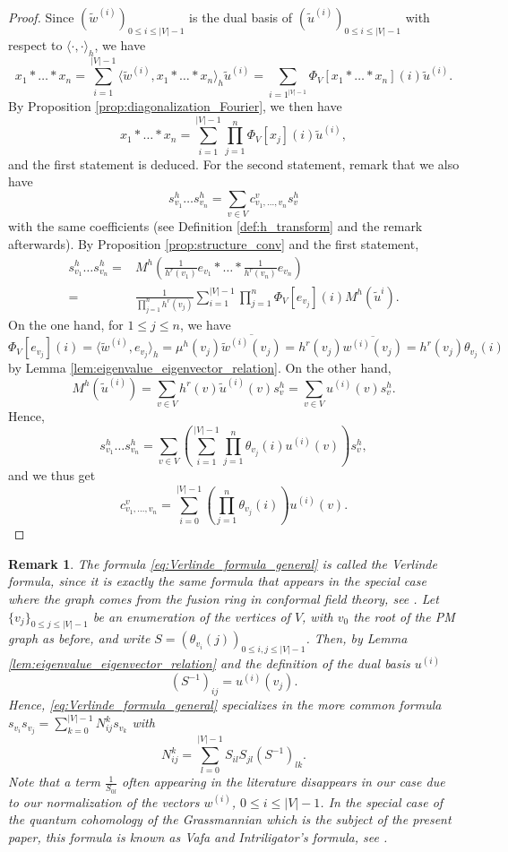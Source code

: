 \documentclass[10pt,11pt]{amsart}%
\newtheorem{remark}[theorem]{Remark}
\begin{document}
\begin{proof}
Since $(\tilde{w}^{(i)})_{0\leq i\leq |V|-1}$ is the dual basis of $(\tilde{u}^{(i)})_{0\leq i\leq |V|-1}$ with respect to $\langle \cdot,\cdot\rangle_h$, we have
$$x_1*\dots *x_n=\sum_{i=1}^{|V|-1}\langle \tilde{w}^{(i)},x_1*\dots *x_n\rangle_h \tilde{u}^{(i)}=\sum_{i=1^{|V|-1}}\Phi_V[x_1*\dots *x_n](i) \tilde{u}^{(i)}.$$
By Proposition \ref{prop:diagonalization_Fourier}, we then have 
$$x_1*\dots *x_n=\sum_{i=1}^{|V|-1}\prod_{j=1}^n\Phi_V[x_j](i)\tilde{u}^{(i)},$$
and the first statement is deduced. For the second statement, remark that we also have
$$s_{v_1}^h\dots s_{v_n}^h=\sum_{v\in V}c_{v_1,\ldots,v_n}^vs_v^h$$
with the same coefficients (see Definition \ref{def:h_transform} and the remark afterwards). By Proposition \ref{prop:structure_conv} and the first statement,
\begin{align*}
s_{v_1}^h\dots s_{v_n}^h=&M^h\left(\frac{1}{h^r(v_1)}e_{v_1}*\dots *\frac{1}{h^r(v_n)}e_{v_n}\right)\\
=&\frac{1}{\prod_{j=1}^nh^r(v_j)}\sum_{i=1}^{|V|-1}\prod_{j=1}^n\Phi_V[e_{v_j}](i)M^h(\tilde{u}^i).
\end{align*}
On the one hand, for $1\leq j\leq n$, we have
$$\Phi_V[e_{v_j}](i)=\langle \tilde{w}^{(i)},e_{v_j}\rangle_h=\mu^h(v_j)\overline{\tilde{w}^{(i)}(v_j)}=h^r(v_j)\overline{w^{(i)}(v_j)}=h^r(v_j)\theta_{v_j}(i)$$
by Lemma \ref{lem:eigenvalue_eigenvector_relation}. On the other hand,
$$M^h(\tilde{u}^{(i)})=\sum_{v\in V}h^r(v)\tilde{u}^{(i)}(v)s^h_{v}=\sum_{v\in V}u^{(i)}(v)s^h_{v}.$$
Hence,
$$s_{v_1}^h\dots s_{v_n}^h=\sum_{v\in V}\left(\sum_{i=1}^{|V|-1}\prod_{j=1}^n\theta_{v_j}(i)u^{(i)}(v)\right) s_{v}^h,$$
and we thus get 
$$c_{v_1,\ldots,v_n}^v=\sum_{i=0}^{|V|-1}\left(\prod_{j=1}^n\theta_{v_j}(i)\right)u^{(i)}(v).$$
\end{proof}
\begin{remark}
The formula \eqref{eq:Verlinde_formula_general} is called the Verlinde formula, since it is exactly the same formula that appears in the special case where the graph comes from the fusion ring in conformal field theory, see \cite{Beauv}. Let $\{v_j\}_{0\leq j\leq |V|-1}$ be an enumeration of the vertices of $V$, with $v_0$ the root of the PM graph as before, and write $S=\left(\theta_{v_i}(j)\right)_{0\leq i,j\leq |V|-1}$. Then, by Lemma \ref{lem:eigenvalue_eigenvector_relation} and the definition of the dual basis $u^{(i)}$
$$\left(S^{-1}\right)_{ij}=u^{(i)}(v_j).$$
Hence, \eqref{eq:Verlinde_formula_general} specializes in the more common formula $s_{v_i}s_{v_j}=\sum_{k=0}^{|V|-1}N_{ij}^ks_{v_k}$ with
$$N_{ij}^k=\sum_{l=0}^{|V|-1}S_{il}S_{jl}\left(S^{-1}\right)_{lk}.$$
Note that a term $\frac{1}{S_{0l}}$ often appearing in the literature disappears in our case due to our normalization of the vectors $w^{(i)}$, $0\leq i\leq |V|-1$. In the special case of the quantum cohomology of the Grassmannian which is the subject of the present paper, this formula is known as Vafa and Intriligator’s formula, see \cite{B}.
\end{remark}
\end{document}

